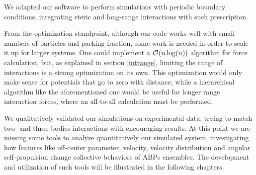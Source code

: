 \documentclass[../../master_thesis_np.tex]{subfiles}
\begin{document}
	We adapted our software to perform simulations with periodic boundary conditions, integrating steric and long-range interactions with such prescription.
	
	From the optimization standpoint, although our code works well with small numbers of particles and packing fraction, some work is needed in order to scale it up for larger systems.
	One could implement a $\order{n \log(n)}$ algorithm \cite{barnes_hierarchical_1986} for force calculation, but, as explained in section \ref{intrange}, limiting the range of interactions is a strong optimization on its own.
	This optimization would only make sense for potentials that go to zero with distance, while a hierarchical algorithm like the aforementioned one would be useful for longer range interaction forces, where an all-to-all calculation must be performed.
	
	We qualitatively validated our simulations on experimental data, trying to match two- and three-bodies interactions with encouraging results.
	At this point we are missing some tools to analyze quantitatively our simulated system, investigating how features like off-center parameter, velocity, velocity distribution and angular self-propulsion change collective behaviors of ABPs ensembles.
	The development and utilization of such tools will be illustrated in the following chapters.
	
\end{document}
